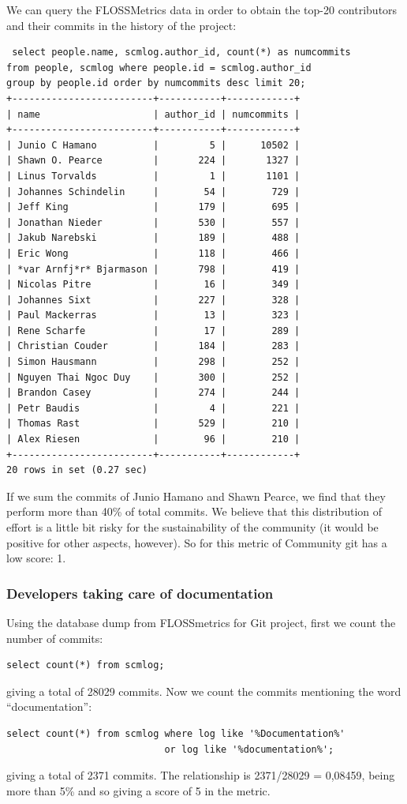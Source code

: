 \documentclass[a4paper,10pt]{article}
\begin{document}
We can query the FLOSSMetrics data in order to obtain the top-20 contributors
and their commits in the history of the project:
\begin{verbatim}
 select people.name, scmlog.author_id, count(*) as numcommits
from people, scmlog where people.id = scmlog.author_id 
group by people.id order by numcommits desc limit 20;
+-------------------------+-----------+------------+
| name                    | author_id | numcommits |
+-------------------------+-----------+------------+
| Junio C Hamano          |         5 |      10502 |
| Shawn O. Pearce         |       224 |       1327 |
| Linus Torvalds          |         1 |       1101 |
| Johannes Schindelin     |        54 |        729 |
| Jeff King               |       179 |        695 |
| Jonathan Nieder         |       530 |        557 |
| Jakub Narebski          |       189 |        488 |
| Eric Wong               |       118 |        466 |
| *var Arnfj*r* Bjarmason |       798 |        419 |
| Nicolas Pitre           |        16 |        349 |
| Johannes Sixt           |       227 |        328 |
| Paul Mackerras          |        13 |        323 |
| Rene Scharfe            |        17 |        289 |
| Christian Couder        |       184 |        283 |
| Simon Hausmann          |       298 |        252 |
| Nguyen Thai Ngoc Duy    |       300 |        252 |
| Brandon Casey           |       274 |        244 |
| Petr Baudis             |         4 |        221 |
| Thomas Rast             |       529 |        210 |
| Alex Riesen             |        96 |        210 |
+-------------------------+-----------+------------+
20 rows in set (0.27 sec)
\end{verbatim}

If we sum the commits of Junio Hamano and Shawn Pearce, we find that they
perform more than 40\% of total commits. We believe that this distribution of
effort is a little bit risky for the sustainability of the community (it would
be positive for other aspects, however). So for this metric of Community git
has a low score: 1. 

\subsubsection{Developers taking care of documentation}
Using the database dump from FLOSSmetrics for Git project, first we count
the number of commits:
\begin{verbatim}
select count(*) from scmlog;
\end{verbatim}
giving a total of 28029 commits.
Now we count the commits mentioning the word ``documentation'':
\begin{verbatim}
select count(*) from scmlog where log like '%Documentation%' 
                            or log like '%documentation%';
\end{verbatim}
giving a total of 2371 commits.
The relationship is 2371/28029 = 0,08459, being more than 5\% and so
giving a score of 5 in the metric.
\end{document}
